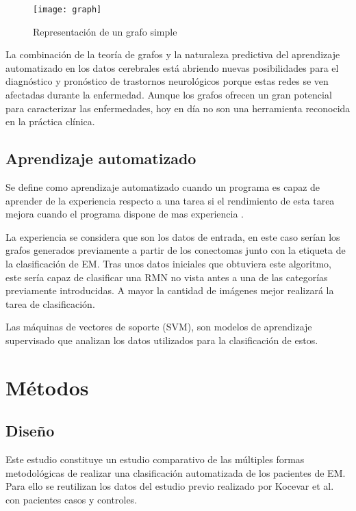 \documentclass[fleqn,10pt]{UICArticle} %
\begin{document}
\begin{figure}[ht]
	\centering
	\texttt{[image: graph]}
	\caption{Representación de un grafo simple}
	\label{fig:graph}
\end{figure}

La combinación de la teoría de grafos y la naturaleza predictiva del aprendizaje automatizado en los datos cerebrales está abriendo nuevas posibilidades para el diagnóstico y pronóstico de trastornos neurológicos porque estas redes se ven afectadas durante la enfermedad. Aunque los grafos ofrecen un gran potencial para caracterizar las enfermedades, hoy en día no son una herramienta reconocida en la práctica clínica.


\subsection{Aprendizaje automatizado}

Se define como aprendizaje automatizado cuando un programa es capaz de aprender de la experiencia respecto a una tarea si el rendimiento de esta tarea mejora cuando el programa dispone de mas experiencia \cite{Friedman1997}.

La experiencia se considera que son los datos de entrada, en este caso serían los grafos generados previamente a partir de los conectomas junto con la etiqueta de la clasificación de EM. Tras unos datos iniciales que obtuviera este algoritmo, este sería capaz de clasificar una RMN no vista antes a una de las categorías previamente introducidas. A mayor la cantidad de imágenes mejor realizará la tarea de clasificación.

Las máquinas de vectores de soporte (SVM), son modelos de aprendizaje supervisado que analizan los datos utilizados para la clasificación de estos.


 

\section{Métodos}

\subsection{Diseño}
Este estudio constituye un estudio comparativo de las múltiples formas metodológicas de realizar una clasificación automatizada de los pacientes de EM. Para ello se reutilizan los datos del estudio previo realizado por Kocevar et al. \cite{Kocevar2016} con pacientes casos y controles.
\end{document}
